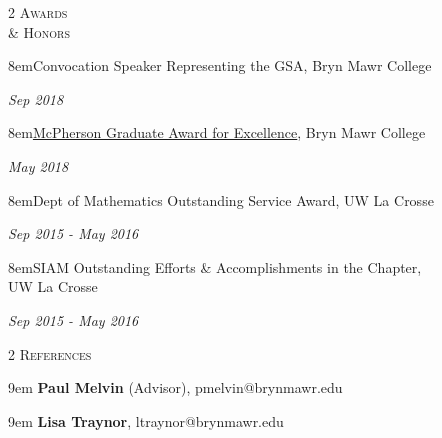 \documentclass[11pt]{article}
\newcommand{\itemreg}[1]{\begin{addmargin}[0em]{9em} #1 \end{addmargin}}
\newcommand{\itemregdate}[2]{\begin{addmargin}[0em]{8em}#1\end{addmargin}\vspace{-1.5em}\hfill\textit{#2}\\ \vspace{.25em}}
\begin{document}
\clearpage

\begin{multicols}{2}
	\textsc{Awards \\ \& Honors}
	
	\columnbreak
	
	\itemregdate{Convocation Speaker Representing the GSA, Bryn Mawr College}{Sep 2018}
		\vspace{.35em}
	\itemregdate{\href{https://www.brynmawr.edu/president/mcpherson-award-excellence}{McPherson Graduate Award for Excellence}, Bryn Mawr College}{May 2018}
		\vspace{.35em}
	\itemregdate{Dept of Mathematics Outstanding Service Award, UW La Crosse}{Sep 2015 - May 2016}
		\vspace{.35em}
	\itemregdate{SIAM Outstanding Efforts \& Accomplishments in the Chapter, \\ UW La Crosse}{Sep 2015 - May 2016}
\end{multicols}
\vspace{-.5em}



\begin{multicols}{2}
	\textsc{References}
	
	\columnbreak
	
	\itemreg{\textbf{Paul Melvin} (Advisor), pmelvin@brynmawr.edu}
	\itemreg{\textbf{Lisa Traynor}, ltraynor@brynmawr.edu}
\end{multicols}


		
\end{document}
